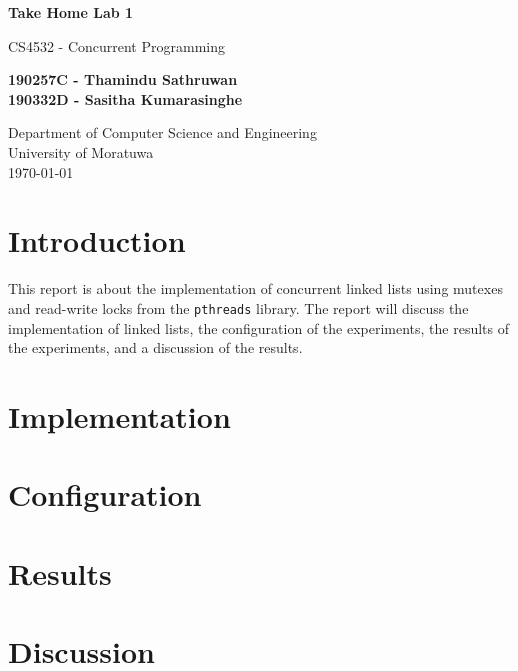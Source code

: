 \documentclass[a4paper,12pt]{article}
\begin{document}
\begin{titlepage}
    \begin{center}
        \vspace*{1cm}

        \LARGE
        \textbf{Take Home Lab 1}

        \vspace{0.5cm}

        \large
        CS4532 - Concurrent Programming

        \vspace{1.5cm}

        \textbf{190257C - Thamindu Sathruwan\\190332D - Sasitha Kumarasinghe}

        \vfill

        \normalsize
        Department of Computer Science and Engineering\\
        University of Moratuwa\\
        \today

    \end{center}
\end{titlepage}

\tableofcontents
\newpage

\section{Introduction}

This report is about the implementation of concurrent linked lists using mutexes and read-write locks from the \lstinline|pthreads| library. The report will discuss the implementation of linked lists, the configuration of the experiments, the results of the experiments, and a discussion of the results.

\section{Implementation}

\section{Configuration}

\section{Results}

\section{Discussion}
\end{document}
